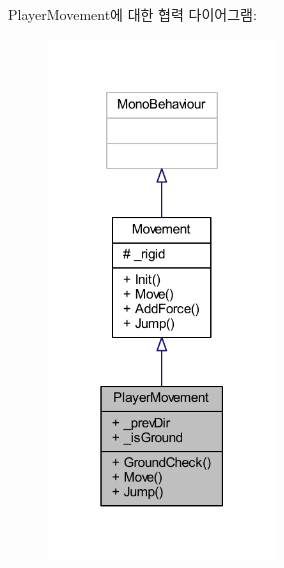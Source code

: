 Player\+Movement에 대한 협력 다이어그램\+:
\nopagebreak
\begin{figure}[H]
\begin{center}
\leavevmode
\includegraphics[width=171pt]{d5/df4/class_player_movement__coll__graph}
\end{center}
\end{figure}
